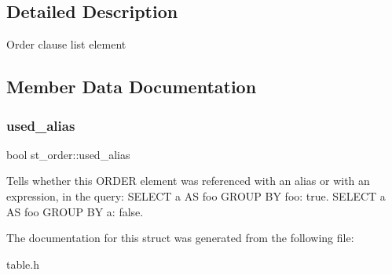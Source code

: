 \subsection{Detailed Description}
Order clause list element 

\subsection{Member Data Documentation}
\mbox{\label{structst__order_a450b9735d629184c9f33b86d7a42749c}} 
\subsubsection{\texorpdfstring{used\+\_\+alias}{used\_alias}}
{\footnotesize\ttfamily bool st\+\_\+order\+::used\+\_\+alias}

Tells whether this O\+R\+D\+ER element was referenced with an alias or with an expression, in the query\+: S\+E\+L\+E\+CT a AS foo G\+R\+O\+UP BY foo\+: true. S\+E\+L\+E\+CT a AS foo G\+R\+O\+UP BY a\+: false. 

The documentation for this struct was generated from the following file\+:\begin{DoxyCompactItemize}
\item 
table.\+h\end{DoxyCompactItemize}
